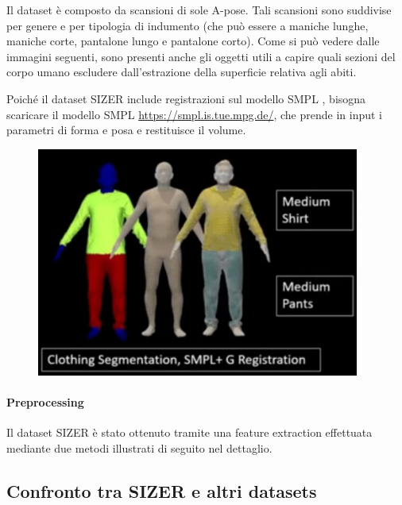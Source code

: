 \medskip

Il dataset è composto da scansioni di sole A-pose. Tali scansioni sono suddivise per genere e per tipologia di indumento (che può essere a maniche lunghe, maniche corte, pantalone lungo e pantalone corto). Come si può vedere dalle immagini seguenti, sono presenti anche gli oggetti utili a capire quali sezioni del corpo umano escludere dall’estrazione della superficie relativa agli abiti.

\newpage

Poiché il dataset SIZER include registrazioni sul modello SMPL , bisogna scaricare il modello SMPL \url{https://smpl.is.tue.mpg.de/}, che prende in input i parametri di forma e posa e restituisce il volume.

\medskip

\begin{figure}[ht!]
  \centering
  \includegraphics[scale=1]{Images/SizerPic/Sizer2.png}
    \label{fig:Sizer2}
\end{figure}

\paragraph{Preprocessing}
Il dataset SIZER è stato ottenuto tramite una feature extraction effettuata mediante due metodi illustrati di seguito nel dettaglio.

\subsection{Confronto tra SIZER e altri datasets}

